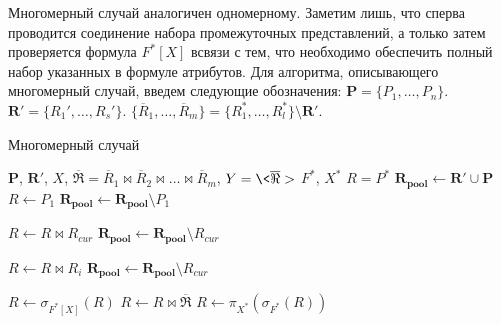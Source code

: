 Многомерный случай аналогичен одномерному. Заметим лишь, что сперва проводится соединение набора промежуточных представлений, а только затем проверяется формула $F^{\ast}[X]$ всвязи с тем, что необходимо обеспечить полный набор указанных в формуле атрибутов.
Для алгоритма, описывающего многомерный случай, введем следующие обозначения:
$\mathbf{P} = \{P_1, \dots, P_n\} $.
$\mathbf{R'} = \{R_1', \dots, R_s'\} $.
$\{\overline{R}_1,\dots,\overline{R}_m\} = \{R^{\ast}_1,\dots,R^{\ast}_l\}
\setminus \mathbf{R'} $.
\begin{algorithm}[H]
\caption{Многомерный случай}
\begin{algorithmic}
\REQUIRE
$\mathbf{P}$,
$\mathbf{R'}$,
$X$,
$\overline{\Re} = \overline{R}_1 \bowtie \overline{R}_2\bowtie\ldots\bowtie
\overline{R}_m $,
$Y = \<\overline{\Re}> $
$F^{\ast}$,
$X^{\ast}$
\ENSURE $R = P^{\ast}$
\STATE $\mathbf{R_{pool}} \leftarrow \mathbf{R'} \cup \mathbf{P} $
\STATE $R \leftarrow P_1$
\STATE $\mathbf{R_{pool}} \leftarrow \mathbf{R_{pool}} \setminus P_1$

         \STATE $ R \leftarrow R \bowtie R_{cur}$
         \STATE $\mathbf{R_{pool}} \leftarrow \mathbf{R_{pool}} \setminus
           R_{cur}$
      \ENDIF
   \ENDFOR
   
            \STATE $ R \leftarrow R \bowtie R_i $
            \STATE $\mathbf{R_{pool}} \leftarrow \mathbf{R_{pool}} \setminus
           R_{cur}$
         \ENDIF
      \ENDFOR  
   \ENDIF
\ENDWHILE

\STATE $R \leftarrow \sigma_{F^{\ast}[X]}(R)$
\STATE $R \leftarrow R \bowtie \overline{\Re}$
\STATE $R \leftarrow \pi_{X^{\ast}}(\sigma_{F^{\ast}}(R))$
\end{algorithmic}
\end{algorithm} 
